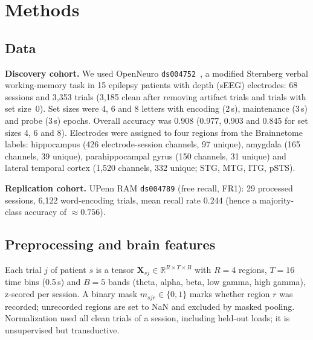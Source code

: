 \documentclass[conference]{IEEEtran}
\begin{document}
\section{Methods}
\subsection{Data}
\textbf{Discovery cohort.} We used OpenNeuro \texttt{ds004752}~\cite{boran2020dataset,dimakopoulos2022elife},
a modified Sternberg verbal working-memory task in 15 epilepsy patients with depth (sEEG)
electrodes: 68 sessions and 3{,}353 trials (3{,}185 clean after removing artifact trials and
trials with set size~0). Set sizes were 4, 6 and 8 letters with encoding (2\,s), maintenance (3\,s)
and probe (3\,s) epochs. Overall accuracy was 0.908 (0.977, 0.903 and 0.845 for set sizes 4, 6 and 8).
Electrodes were assigned to four regions from the Brainnetome labels: hippocampus (426 electrode-session channels, 97 unique), amygdala (165 channels, 39 unique), parahippocampal gyrus (150 channels, 31 unique) and lateral temporal cortex (1{,}520 channels, 332 unique; STG, MTG, ITG, pSTS).

\textbf{Replication cohort.} UPenn RAM \texttt{ds004789} (free recall, FR1): 29 processed
sessions, 6{,}122 word-encoding trials, mean recall rate 0.244 (hence a majority-class accuracy of $\approx0.756$).

\subsection{Preprocessing and brain features}
Each trial $j$ of patient $s$ is a tensor $\mathbf X_{sj}\in\mathbb R^{R\times T\times B}$ with
$R=4$ regions, $T=16$ time bins (0.5\,s) and $B=5$ bands
(theta, alpha, beta, low gamma, high gamma), z-scored per session. A binary mask $m_{sjr}\in\{0,1\}$ marks
whether region $r$ was recorded; unrecorded regions are set to NaN and excluded by masked pooling.
Normalization used all clean trials of a session, including held-out loads; it is unsupervised but transductive.
\end{document}
